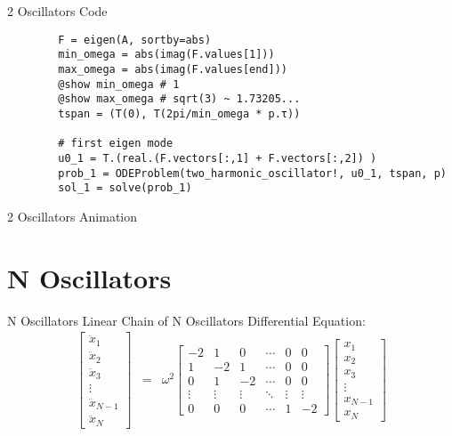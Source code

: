 \documentclass[aspectratio=169]{beamer}
\begin{document}
\begin{frame}[fragile]{2 Oscillators Code}
    \begin{verbatim}
        F = eigen(A, sortby=abs)
        min_omega = abs(imag(F.values[1]))
        max_omega = abs(imag(F.values[end]))
        @show min_omega # 1
        @show max_omega # sqrt(3) ~ 1.73205...
        tspan = (T(0), T(2pi/min_omega * p.τ))

        # first eigen mode
        u0_1 = T.(real.(F.vectors[:,1] + F.vectors[:,2]) )
        prob_1 = ODEProblem(two_harmonic_oscillator!, u0_1, tspan, p)
        sol_1 = solve(prob_1)
    \end{verbatim}
\end{frame}

\begin{frame}{2 Oscillators Animation}
    \centering
\end{frame}



\section{N Oscillators}

\begin{frame}{N Oscillators}
    Linear Chain of N Oscillators Differential Equation:
    \begin{eqnarray}
        \begin{bmatrix}
            \ddot x_1 \\ \ddot x_2 \\ \ddot x_3 \\ \vdots \\ \ddot x_{N-1}  \\ \ddot x_N 
        \end{bmatrix}   & = & 
        \omega^2
        \begin{bmatrix}
            -2 & 1 & 0 & \cdots & 0 & 0\\
            1 & -2 & 1 & \cdots & 0 & 0\\  
            0 & 1 & -2 & \cdots & 0 & 0\\      
            \vdots & \vdots & \vdots & \ddots & \vdots & \vdots \\
            0 & 0 & 0 & \cdots & 1 & -2
        \end{bmatrix}
        \begin{bmatrix}
            x_1 \\  x_2 \\  x_3 \\ \vdots \\ x_{N-1} \\  x_N 
        \end{bmatrix} 
    \end{eqnarray}
\end{frame}
\end{document}

